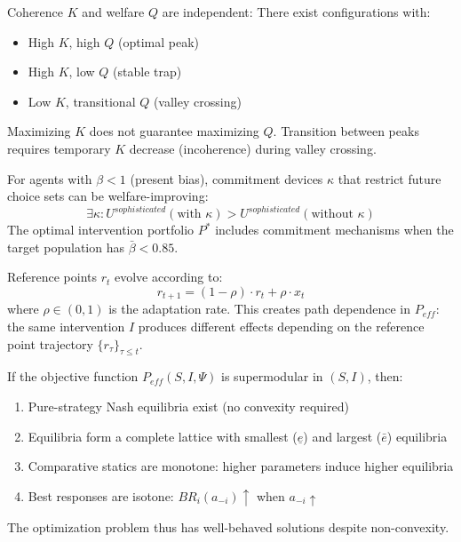 \begin{theorem}[MP-T8: K-Q Independence]
Coherence $K$ and welfare $Q$ are independent: There exist configurations with:
\begin{itemize}
\item High $K$, high $Q$ (optimal peak)
\item High $K$, low $Q$ (stable trap)
\item Low $K$, transitional $Q$ (valley crossing)
\end{itemize}
Maximizing $K$ does not guarantee maximizing $Q$. Transition between peaks requires
temporary $K$ decrease (incoherence) during valley crossing.
\end{theorem}

\begin{theorem}
For agents with $\beta < 1$ (present bias), commitment devices $\kappa$ that
restrict future choice sets can be welfare-improving:
\[
\exists \kappa : U^{sophisticated}(\text{with } \kappa) > U^{sophisticated}(\text{without } \kappa)
\]
The optimal intervention portfolio $P^*$ includes commitment mechanisms when
the target population has $\bar{\beta} < 0.85$.
\end{theorem}

\begin{theorem}
Reference points $r_t$ evolve according to:
\[
r_{t+1} = (1-\rho) \cdot r_t + \rho \cdot x_t
\]
where $\rho \in (0,1)$ is the adaptation rate. This creates path dependence in
$P_{eff}$: the same intervention $I$ produces different effects depending on
the reference point trajectory $\{r_\tau\}_{\tau \leq t}$.
\end{theorem}

\begin{theorem}
If the objective function $P_{eff}(S, I, \Psi)$ is supermodular in $(S, I)$, then:
\begin{enumerate}
\item Pure-strategy Nash equilibria exist (no convexity required)
\item Equilibria form a complete lattice with smallest ($\underline{e}$) and largest ($\bar{e}$) equilibria
\item Comparative statics are monotone: higher parameters induce higher equilibria
\item Best responses are isotone: $BR_i(a_{-i}) \uparrow$ when $a_{-i} \uparrow$
\end{enumerate}
The optimization problem thus has well-behaved solutions despite non-convexity.
\end{theorem}

